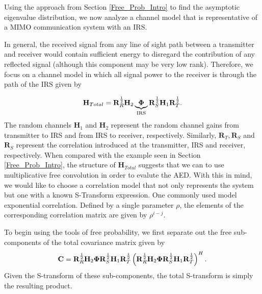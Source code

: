 Using the approach from Section \ref{Free_Prob_Intro} to find the asymptotic eigenvalue distribution, we now analyze a channel model that is representative of a MIMO communication system with an IRS. 
\par
In general, the received signal from any line of sight path between a transmitter and receiver would contain  sufficient energy to disregard the contribution of any reflected signal (although this component may be very low rank).  Therefore, we focus on a channel model in which all signal power to the receiver is through the path of the IRS  given by

	\begin{equation}\label{correlated_channel}
	\mathbf{H}_{Total} = \mathbf{R}_{R}^{\frac{1}{2}}\mathbf{H}_{2}\underbrace{\boldsymbol{\Phi}}_{\text{IRS}}\mathbf{R}_{S}^{\frac{1}{2}}\mathbf{H}_{1}\mathbf{R}_{T}^{\frac{1}{2}}.
	\end{equation}
The random channels $\mathbf{H}_{1}$ and $\mathbf{H}_{2}$ represent the random channel gains from transmitter to IRS and from IRS to receiver, respectively. Similarly, $ \mathbf{R}_{T},  \mathbf{R}_{S} $ and  $\mathbf{R}_{S}$ represent the correlation introduced at the transmitter, IRS and receiver, respectively. 
When compared with the example seen in Section \ref{Free_Prob_Intro}, the structure of $\mathbf{H}_{Total}$ suggests that we can to use multiplicative free convolution in order to evalute the AED. With this in mind, we would like to choose a correlation model  that not only represents the system but one with a known S-Transform expression. 
One commonly used model exponential correlation. Defined by a single parameter $\rho$, the elements of the corresponding correlation matrix are given by $\rho^{i-j}$.
\par
To begin using the tools of free probability, we first separate out the free sub-components of the total covariance matrix given by 
	\begin{equation}
	\mathbf{C} = \mathbf{R}_{R}^{\frac{1}{2}}\mathbf{H}_{2}\boldsymbol{\Phi} \mathbf{R}_{S}^{\frac{1}{2}}\mathbf{H}_{1}\mathbf{R}_{T}^{\frac{1}{2}}
	\left(\mathbf{R}_{R}^{\frac{1}{2}}\mathbf{H}_{2}\boldsymbol{\Phi} \mathbf{R}_{S}^{\frac{1}{2}}\mathbf{H}_{1}\mathbf{R}_{T}^{\frac{1}{2}}\right)^H.
	\end{equation}
Given the S-transform of these sub-components, the total S-transform is simply the resulting product.
